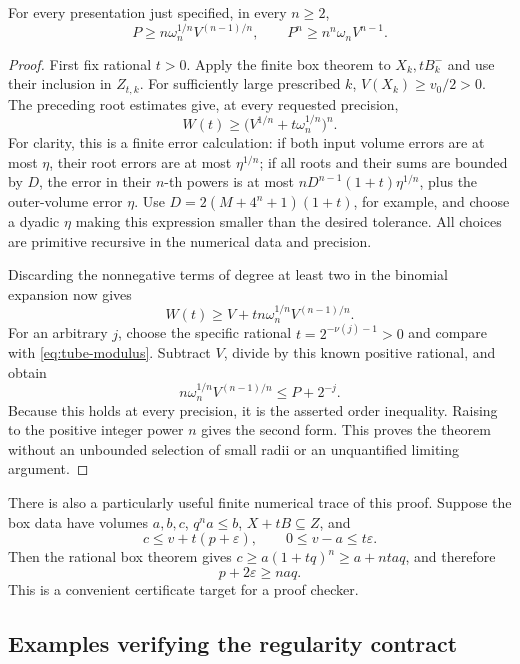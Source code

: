 \begin{theorem}
\label{thm:euclidean-isoperimetry}
For every presentation just specified, in every \(n\geq2\),
\[
 P\geq n\omega_n^{1/n}V^{(n-1)/n},
 \qquad
 P^n\geq n^n\omega_n V^{n-1}.
\]
\end{theorem}
\begin{proof}
First fix rational \(t>0\). Apply the finite box theorem to
\(X_k,tB_k^-\) and use their inclusion in \(Z_{t,k}\).
For sufficiently large prescribed \(k\), \(V(X_k)\geq v_0/2>0\).
The preceding root estimates give, at every requested precision,
\[
 W(t)\geq\bigl(V^{1/n}+t\omega_n^{1/n}\bigr)^n.
\]
For clarity, this is a finite error calculation: if both input volume
errors are at most \(\eta\), their root errors are at most
\(\eta^{1/n}\); if all roots and their sums are bounded by \(D\),
the error in their \(n\)-th powers is at most
\(nD^{n-1}(1+t)\eta^{1/n}\), plus the outer-volume error \(\eta\).
Use \(D=2(M+4^n+1)(1+t)\), for example, and choose a dyadic
\(\eta\) making this expression smaller than the desired tolerance.
All choices are primitive recursive in the numerical data and precision.

Discarding the nonnegative terms of degree at least two in the binomial
expansion now gives
\[
 W(t)\geq V+tn\omega_n^{1/n}V^{(n-1)/n}.
\]
For an arbitrary \(j\), choose the specific rational
\(t=2^{-\nu(j)-1}>0\) and compare with
\eqref{eq:tube-modulus}. Subtract \(V\), divide by this known positive
rational, and obtain
\[
 n\omega_n^{1/n}V^{(n-1)/n}\leq P+2^{-j}.
\]
Because this holds at every precision, it is the asserted order
inequality. Raising to the positive integer power \(n\) gives the
second form. This proves the theorem without an unbounded selection of
small radii or an unquantified limiting argument.
\end{proof}

There is also a particularly useful finite numerical trace of this proof.
Suppose the box data have volumes \(a,b,c\), \(q^na\leq b\),
\(X+tB\subseteq Z\), and
\[
 c\leq v+t(p+\varepsilon),\qquad 0\leq v-a\leq t\varepsilon.
\]
Then the rational box theorem gives
\(c\geq a(1+tq)^n\geq a+ntaq\), and therefore
\begin{equation}\label{eq:finite-isop-trace}
 p+2\varepsilon\geq naq.
\end{equation}
This is a convenient certificate target for a proof checker.

\subsection{Examples verifying the regularity contract}

